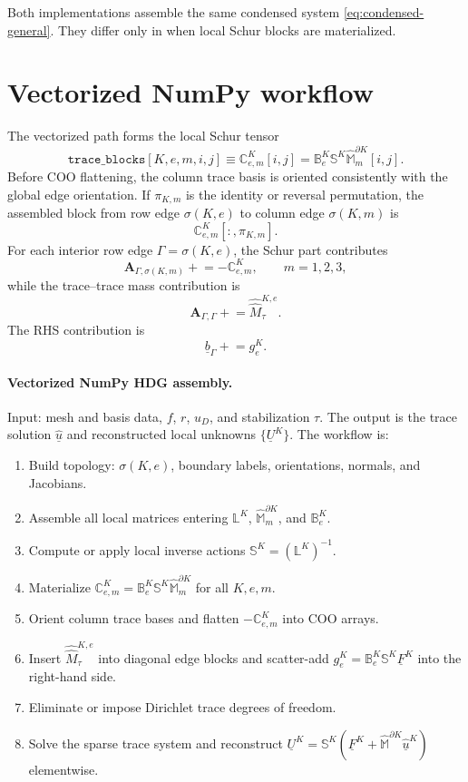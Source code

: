 \documentclass[11pt]{article}
\newcommand{\uhat}{\underline{\widehat u}}
\newcommand{\UK}{\underline U^K}
\newcommand{\FK}{\underline F^K}
\newcommand{\LK}{\mathbb L^K}
\newcommand{\SK}{\mathbb S^K}
\newcommand{\B}{\mathbb B}
\newcommand{\C}{\mathbb C}
\newcommand{\Mbb}{\widehat{\mathbb M}}
\newcommand{\Mhh}{\widehat{\widehat M}}
\newcommand{\code}[1]{\texttt{#1}}
\begin{document}
Both implementations assemble the same condensed system \eqref{eq:condensed-general}. They differ only in when local Schur blocks are materialized.

\section{Vectorized NumPy workflow}

The vectorized path forms the local Schur tensor
\begin{equation}\label{eq:trace-block-tensor}
    \code{trace\_blocks}[K,e,m,i,j]
    \equiv
    \C_{e,m}^K[i,j]
    =
    \B_e^K\SK\Mbb_m^{\partial K}[i,j].
\end{equation}
Before COO flattening, the column trace basis is oriented consistently with the global edge orientation. If $\pi_{K,m}$ is the identity or reversal permutation, the assembled block from row edge $\sigma(K,e)$ to column edge $\sigma(K,m)$ is
\[
    \C_{e,m}^K[:,\pi_{K,m}].
\]
For each interior row edge $\Gamma=\sigma(K,e)$, the Schur part contributes
\[
    \mathbf A_{\Gamma,\sigma(K,m)} \mathrel{+}= -\C_{e,m}^K,
    \qquad m=1,2,3,
\]
while the trace--trace mass contribution is
\[
    \mathbf A_{\Gamma,\Gamma}\mathrel{+}=\Mhh_\tau^{K,e}.
\]
The RHS contribution is
\[
    \underline b_\Gamma\mathrel{+}=g_e^K.
\]

\paragraph{Vectorized NumPy HDG assembly.}
Input: mesh and basis data, $f$, $r$, $u_D$, and stabilization $\tau$.
The output is the trace solution $\uhat$ and reconstructed local unknowns
$\{\UK\}$. The workflow is:
\begin{enumerate}[leftmargin=*,nosep]
\item Build topology: $\sigma(K,e)$, boundary labels, orientations, normals,
      and Jacobians.
\item Assemble all local matrices entering $\LK$, $\Mbb_m^{\partial K}$,
      and $\B_e^K$.
\item Compute or apply local inverse actions $\SK=(\LK)^{-1}$.
\item Materialize $\C_{e,m}^K=\B_e^K\SK\Mbb_m^{\partial K}$ for all
      $K,e,m$.
\item Orient column trace bases and flatten $-\C_{e,m}^K$ into COO arrays.
\item Insert $\Mhh_\tau^{K,e}$ into diagonal edge blocks and scatter-add
      $g_e^K=\B_e^K\SK\FK$ into the right-hand side.
\item Eliminate or impose Dirichlet trace degrees of freedom.
\item Solve the sparse trace system and reconstruct
      $\UK=\SK(\FK+\Mbb^{\partial K}\uhat^K)$ elementwise.
\end{enumerate}
\end{document}
